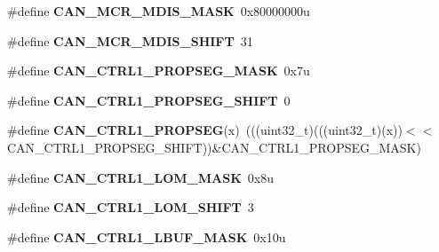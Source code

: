 \begin{DoxyCompactItemize}
\item 
\#define {\bfseries C\+A\+N\+\_\+\+M\+C\+R\+\_\+\+M\+D\+I\+S\+\_\+\+M\+A\+SK}~0x80000000u\hypertarget{group__CAN__Register__Masks_gaadea43214ec6dcbab21d59988ae401bb}{}\label{group__CAN__Register__Masks_gaadea43214ec6dcbab21d59988ae401bb}

\item 
\#define {\bfseries C\+A\+N\+\_\+\+M\+C\+R\+\_\+\+M\+D\+I\+S\+\_\+\+S\+H\+I\+FT}~31\hypertarget{group__CAN__Register__Masks_ga15f1bf3b87536155c2b13f279b06ba93}{}\label{group__CAN__Register__Masks_ga15f1bf3b87536155c2b13f279b06ba93}

\item 
\#define {\bfseries C\+A\+N\+\_\+\+C\+T\+R\+L1\+\_\+\+P\+R\+O\+P\+S\+E\+G\+\_\+\+M\+A\+SK}~0x7u\hypertarget{group__CAN__Register__Masks_ga0541429f7e3d35ec374c462a83c3ef49}{}\label{group__CAN__Register__Masks_ga0541429f7e3d35ec374c462a83c3ef49}

\item 
\#define {\bfseries C\+A\+N\+\_\+\+C\+T\+R\+L1\+\_\+\+P\+R\+O\+P\+S\+E\+G\+\_\+\+S\+H\+I\+FT}~0\hypertarget{group__CAN__Register__Masks_ga7eada40e9f9aafd9d58c38b3a3b295b5}{}\label{group__CAN__Register__Masks_ga7eada40e9f9aafd9d58c38b3a3b295b5}

\item 
\#define {\bfseries C\+A\+N\+\_\+\+C\+T\+R\+L1\+\_\+\+P\+R\+O\+P\+S\+EG}(x)~(((uint32\+\_\+t)(((uint32\+\_\+t)(x))$<$$<$C\+A\+N\+\_\+\+C\+T\+R\+L1\+\_\+\+P\+R\+O\+P\+S\+E\+G\+\_\+\+S\+H\+I\+FT))\&C\+A\+N\+\_\+\+C\+T\+R\+L1\+\_\+\+P\+R\+O\+P\+S\+E\+G\+\_\+\+M\+A\+SK)\hypertarget{group__CAN__Register__Masks_ga57ce21067eb8d33398e104ce39eb5100}{}\label{group__CAN__Register__Masks_ga57ce21067eb8d33398e104ce39eb5100}

\item 
\#define {\bfseries C\+A\+N\+\_\+\+C\+T\+R\+L1\+\_\+\+L\+O\+M\+\_\+\+M\+A\+SK}~0x8u\hypertarget{group__CAN__Register__Masks_gac216e0dd5c6df92a49c15077ca628187}{}\label{group__CAN__Register__Masks_gac216e0dd5c6df92a49c15077ca628187}

\item 
\#define {\bfseries C\+A\+N\+\_\+\+C\+T\+R\+L1\+\_\+\+L\+O\+M\+\_\+\+S\+H\+I\+FT}~3\hypertarget{group__CAN__Register__Masks_gafd8f79e66670cb6df0d70e93795649c6}{}\label{group__CAN__Register__Masks_gafd8f79e66670cb6df0d70e93795649c6}

\item 
\#define {\bfseries C\+A\+N\+\_\+\+C\+T\+R\+L1\+\_\+\+L\+B\+U\+F\+\_\+\+M\+A\+SK}~0x10u\hypertarget{group__CAN__Register__Masks_ga91b1b6502a9996e9639d28760d00ee88}{}\label{group__CAN__Register__Masks_ga91b1b6502a9996e9639d28760d00ee88}


\end{DoxyCompactItemize}

